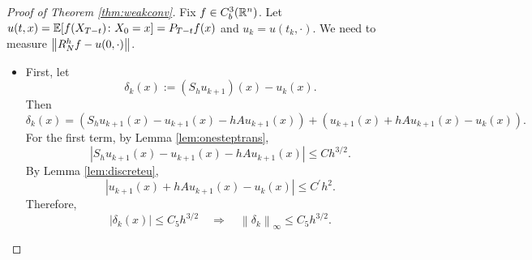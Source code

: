 \begin{proof}[Proof of Theorem \ref{thm:weakconv}]
    Fix $f \in C^3_b(\mathbb{R}^n)$. Let $u(t,x) = \mathbb{E}[f(X_{T-t}) \colon X_0 = x] = P_{T-t}f(x)$ and $u_k = u(t_k,\cdot)$. We need to measure $\left\lVert R^h_Nf - u(0,\cdot)\right\lVert$.
    \begin{itemize}
        \item First, let
        \begin{equation*}
            \delta_k(x):=\left(S_h u_{k+1}\right)(x)-u_k(x) .
        \end{equation*}
        Then
        \begin{equation*}
            \delta_k(x)=\left(S_h u_{k+1}(x)-u_{k+1}(x)-h A u_{k+1}(x)\right)+\left(u_{k+1}(x)+h A u_{k+1}(x)-u_k(x)\right) .
        \end{equation*}
        For the first term, by Lemma \ref{lem:onesteptrans},
        \begin{equation*}
            \left|S_h u_{k+1}(x)-u_{k+1}(x)-h A u_{k+1}(x)\right| \leq C h^{3 / 2} .
        \end{equation*}
        By Lemma \ref{lem:discreteu},
        \begin{equation*}
            \left|u_{k+1}(x)+h A u_{k+1}(x)-u_k(x)\right| \leq C^\prime h^2 .
        \end{equation*}
        Therefore,
        \begin{equation*}
            \left|\delta_k(x)\right| \leq C_5 h^{3 / 2} \quad \Longrightarrow \quad\left\|\delta_k\right\|_{\infty} \leq C_5 h^{3 / 2} .
        \end{equation*}


\end{itemize}
\end{proof}
